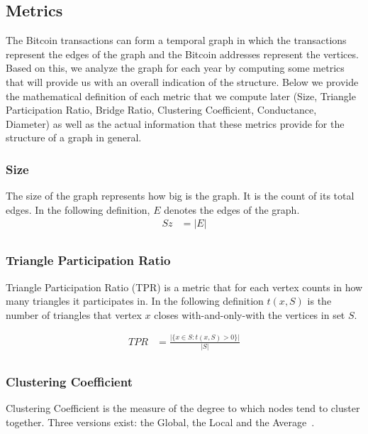 \subsection{Metrics}
\label{label:metrics} The Bitcoin transactions can form a temporal graph in
which the transactions represent the edges of the graph and the Bitcoin
addresses represent the vertices. Based on this, we analyze the graph for each
year by computing some metrics that will provide us with an overall indication
of the structure. Below we provide the mathematical definition of each metric
that we compute later (Size, Triangle Participation Ratio, Bridge Ratio,
Clustering Coefficient, Conductance, Diameter) as well as the actual
information that these metrics provide for the structure of a graph in general.


\subsubsection{Size}
The size of the graph represents how big is the graph. It is the count of its total edges. In the following definition, ${\textstyle E}$ denotes the edges of the graph. 
\begin{align*}
  Sz &= \vert E \vert\\
\end{align*}



\subsubsection{Triangle Participation Ratio}
Triangle Participation Ratio (TPR) is a metric that for each vertex counts in how many triangles it participates in. In the following definition ${\textstyle t(x,S)}$ is the number of triangles that vertex ${\textstyle x}$ closes with-and-only-with the vertices in set ${\textstyle S}$.

\begin{align*}
  TPR &= \frac{\vert{\{x\in S : t(x,S) > 0 \}}\vert}{\vert S\vert}\\
\end{align*}



\subsubsection{Clustering Coefficient}
Clustering Coefficient is the measure of the degree to which nodes tend to cluster together. Three versions exist: the Global, the Local and the Average~\cite{cc}. 


